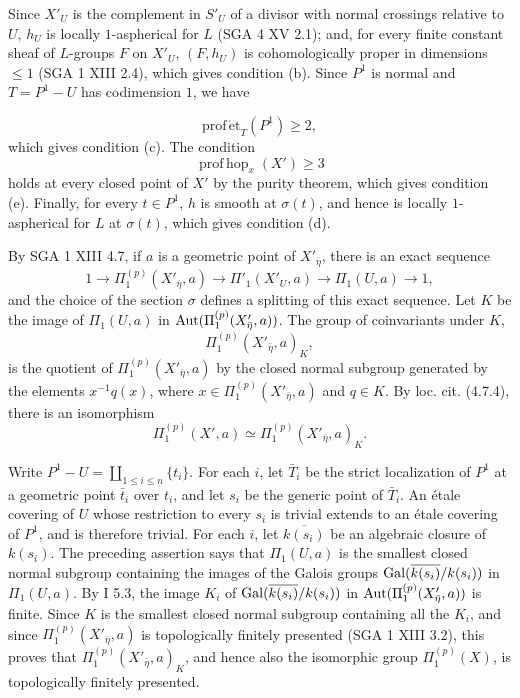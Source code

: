 Since $X'_U$ is the complement in $S'_U$ of a divisor with normal
crossings relative to $U$, $h_U$ is locally $1$-aspherical for $L$
(SGA 4 XV 2.1); and, for every finite constant sheaf of $L$-groups $F$
on $X'_U$, $(F,h_U)$ is cohomologically proper in dimensions $\leq 1$
(SGA 1 XIII 2.4), which gives condition (b). Since $P^1$ is normal and
$T=P^1-U$ has codimension $1$, we have


\[
 \operatorname{prof\,\acute et}_T(P^1)\geq 2,
\]
which gives condition (c). The condition
\[
 \operatorname{prof\,hop}_x(X')\geq 3
\]
holds at every closed point of $X'$ by the purity theorem, which gives
condition (e). Finally, for every $t\in P^1$, $h$ is smooth at
$\sigma(t)$, and hence is locally $1$-aspherical for $L$ at $\sigma(t)$,
which gives condition (d).

By SGA 1 XIII 4.7, if $a$ is a geometric point of
$X'_{\bar\eta}$, there is an exact sequence
\[
 1\longrightarrow\Pi_1^{(p)}(X'_{\bar\eta},a)
 \longrightarrow\Pi'_1(X'_U,a)
 \longrightarrow\Pi_1(U,a)\longrightarrow 1,
\]
and the choice of the section $\sigma$ defines a splitting of this exact
sequence. Let $K$ be the image of $\Pi_1(U,a)$ in
$\operatorname{Aut}(\Pi_1^{(p)}(X'_{\bar\eta},a))$. The group of coinvariants under
$K$,
\[
 \Pi_1^{(p)}(X'_{\bar\eta},a)_K,
\]
is the quotient of $\Pi_1^{(p)}(X'_{\bar\eta},a)$ by the closed normal
subgroup generated by the elements $x^{-1}q(x)$, where
$x\in\Pi_1^{(p)}(X'_{\bar\eta},a)$ and $q\in K$. By loc. cit. (4.7.4),
there is an isomorphism
\[
 \Pi_1^{(p)}(X',a)\simeq
 \Pi_1^{(p)}(X'_{\bar\eta},a)_K.
\]

Write $P^1-U=\coprod_{1\leq i\leq n}\{t_i\}$. For each $i$, let
$\bar T_i$ be the strict localization of $P^1$ at a geometric point
$\bar t_i$ over $t_i$, and let $s_i$ be the generic point of $\bar T_i$.
An \'etale covering of $U$ whose restriction to every $s_i$ is trivial
extends to an \'etale covering of $P^1$, and is therefore trivial. For
each $i$, let $\overline{k(s_i)}$ be an algebraic closure of $k(s_i)$.
The preceding assertion says that $\Pi_1(U,a)$ is the smallest closed
normal subgroup containing the images of the Galois groups
$\operatorname{Gal}(\overline{k(s_i)}/k(s_i))$ in $\Pi_1(U,a)$. By I 5.3, the image
$K_i$ of $\operatorname{Gal}(\overline{k(s_i)}/k(s_i))$ in
$\operatorname{Aut}(\Pi_1^{(p)}(X'_{\bar\eta},a))$ is finite. Since $K$ is the
smallest closed normal subgroup containing all the $K_i$, and since
$\Pi_1^{(p)}(X'_{\bar\eta},a)$ is topologically finitely presented
(SGA 1 XIII 3.2), this proves that
$\Pi_1^{(p)}(X'_{\bar\eta},a)_K$, and hence also the isomorphic group
$\Pi_1^{(p)}(X)$, is topologically finitely presented.

